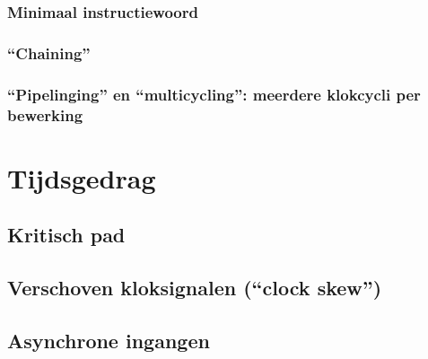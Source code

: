 \subsubsection{Minimaal instructiewoord}
\subsubsection{``Chaining''}
\subsubsection{``Pipelinging'' en ``multicycling'': meerdere klokcycli per bewerking}
\section{Tijdsgedrag}
\label{s:timeFSMD}
\subsection{Kritisch pad}
\subsection{Verschoven kloksignalen (``clock skew'')}
\subsection{Asynchrone ingangen}
